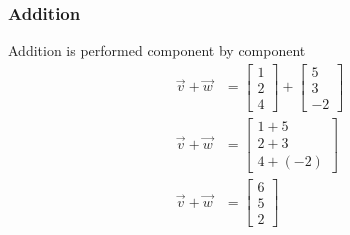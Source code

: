 \documentclass{article}
\begin{document}
\subsubsection{Addition}
Addition is performed component by component
\begin{equation*}
	\begin{aligned}
		\vec{v} + \vec{w} &=
		\begin{bmatrix}
			1 \\
			2 \\
			4
		\end{bmatrix}
		+
		\begin{bmatrix}
			5 \\
			3 \\
			-2
		\end{bmatrix}
		\\
		\vec{v} + \vec{w} &=
		\begin{bmatrix}
			1 + 5 \\
			2 + 3 \\
			4 + (-2)
		\end{bmatrix}
		\\
		\vec{v} + \vec{w} &=
		\begin{bmatrix}
			6 \\
			5 \\
			2
		\end{bmatrix}
	\end{aligned}
\end{equation*}
\end{document}
